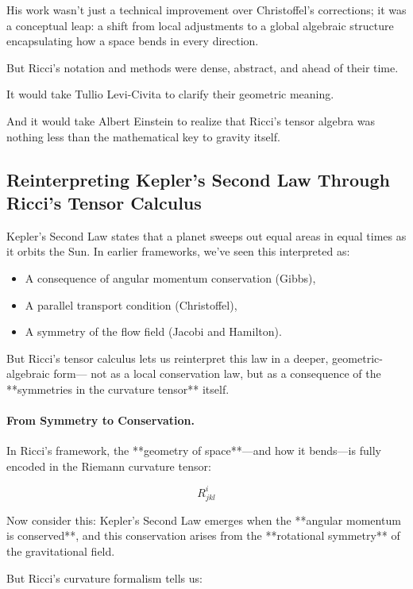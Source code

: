 His work wasn’t just a technical improvement over Christoffel’s corrections;  
it was a conceptual leap:  
a shift from local adjustments to a global algebraic structure encapsulating how a space bends in every direction.

But Ricci’s notation and methods were dense, abstract, and ahead of their time.

It would take Tullio Levi-Civita to clarify their geometric meaning.

And it would take Albert Einstein to realize that Ricci’s tensor algebra was nothing less than the mathematical key to gravity itself.

\subsection*{Reinterpreting Kepler’s Second Law Through Ricci’s Tensor Calculus}

Kepler’s Second Law states that a planet sweeps out equal areas in equal times as it orbits the Sun.  
In earlier frameworks, we’ve seen this interpreted as:

\begin{itemize}
    \item A consequence of angular momentum conservation (Gibbs),
    \item A parallel transport condition (Christoffel),
    \item A symmetry of the flow field (Jacobi and Hamilton).
\end{itemize}

But Ricci’s tensor calculus lets us reinterpret this law in a deeper, geometric-algebraic form—  
not as a local conservation law, but as a consequence of the **symmetries in the curvature tensor** itself.

\bigskip

\paragraph{From Symmetry to Conservation.}

In Ricci’s framework, the **geometry of space**—and how it bends—is fully encoded in the Riemann curvature tensor:

\[
R^i_{jkl}
\]

Now consider this:  
Kepler’s Second Law emerges when the **angular momentum is conserved**, and this conservation arises from the **rotational symmetry** of the gravitational field.

But Ricci’s curvature formalism tells us:

